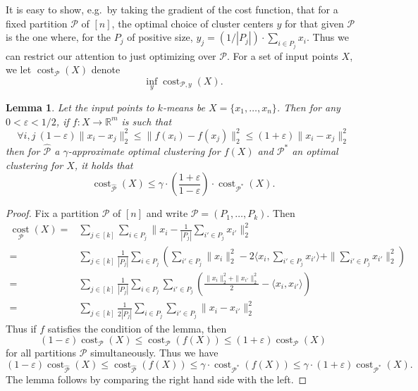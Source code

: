 \documentclass[12pt]{article}
\newcommand{\eps}{\varepsilon}
\newcommand{\R}{\mathbb{R}}
\newtheorem{lemma}{Lemma}
\begin{document}
It is easy to show, e.g.\ by taking the gradient of the cost function, that for a fixed partition $\mathcal{P}$ of $[n]$, the optimal choice of cluster centers $y$ for that given $\mathcal{P}$ is the one where, for the $P_j$ of positive size, $y_j = (1/|P_j|)\cdot \sum_{i\in P_j}x_i$. Thus we can restrict our attention to just optimizing over $\mathcal{P}$. For a set of input points $X$, we let $\mathop{cost}_{\mathcal{P}}(X)$ denote 
$$
\inf_y \mathop{cost}_{\mathcal{P}, y}(X) .
$$

\begin{lemma} 
Let the input points to $k$-means be $X = \{x_1,\ldots,x_n\}$. Then for any $0<\eps<1/2$, if $f:X\rightarrow\R^m$ is such that
$$
\forall i, j\ (1-\eps)\|x_i - x_j\|_2^2 \le \|f(x_i) - f(x_j)\|_2^2 \le (1+\eps)\|x_i - x_j\|_2^2
$$
then for $\hat{\mathcal{P}}$ a $\gamma$-approximate optimal clustering for $f(X)$ and $\mathcal{P}^*$ an optimal clustering for $X$, it holds that
$$
\mathop{cost}_{\hat{\mathcal{P}}}(X) \le \gamma\cdot \left(\frac{1+\eps}{1-\eps}\right)\cdot \mathop{cost}_{\mathcal{P}^*}(X) .
$$
\end{lemma}
\begin{proof}
Fix a partition $\mathcal{P}$ of $[n]$ and write $\mathcal{P} = (P_1,\ldots,P_k)$. Then
\begin{align*}
\underset{\mathcal{P}}{\mathop{cost}}(X) =& \sum_{j \in [k]} \sum_{i\in P_j} \|x_i - \frac{1}{|P_j|} \sum_{i'\in P_j} x_{i'}\|_2^2\\
=& \sum_{j \in [k]}  \frac{1}{|P_j|} \sum_{i \in P_j} \left( \sum_{i' \in P_j} \|x_i\|_2^2 - 2 \langle x_i, \sum_{i' \in P_j} x_{i'} \rangle + \|\sum_{i' \in P_j}  x_{i'}\|_2^2 \right)\\
=& \sum_{j \in [k]}  \frac{1}{|P_j|}  \sum_{i \in P_j} \sum_{i' \in P_j} \left( \frac{\|x_i\|_2^2 + \|x_{i'}\|_2^2}{2} - \langle x_i,x_{i'} \rangle\right)\\
=& \sum_{j \in [k]}  \frac{1}{2|P_j|} \sum_{i \in P_j} \sum_{i' \in P_j} \|x_i-x_{i'}\|_2^2
\end{align*}
Thus if $f$ satisfies the condition of the lemma, then
$$
(1-\eps) \mathop{cost}_{\mathcal{P}}(X) \le \mathop{cost}_{\mathcal{P}}(f(X)) \le (1+\eps) \mathop{cost}_{\mathcal{P}}(X)
$$
for all partitions $\mathcal{P}$ simultaneously. Thus we have
$$
(1-\eps)\mathop{cost}_{\hat{\mathcal{P}}}(X) \le \mathop{cost}_{\hat{\mathcal{P}}}(f(X)) \le \gamma\cdot \mathop{cost}_{\mathcal{P}^*}(f(X)) \le \gamma\cdot (1+\eps) \mathop{cost}_{\mathcal{P}^*}(X) .
$$
The lemma follows by comparing the right hand side with the left.
\end{proof}



\end{document}
